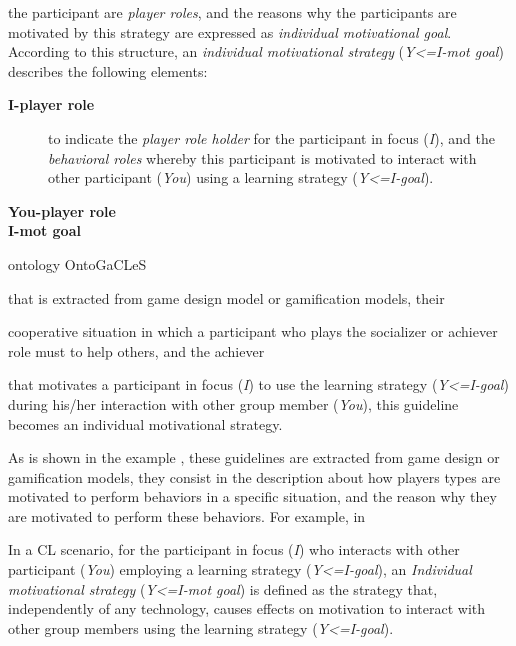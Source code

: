 the participant are \emph{player roles}, and the reasons why the participants are motivated by this strategy are expressed as \emph{individual motivational goal}. According to this structure, an \emph{individual motivational strategy} (\emph{Y<=I-mot goal}) describes the following elements:

\begin{description}
\item[\textbf{I-player role}] 
to indicate the \emph{player role holder} for the participant in focus (\emph{I}), and the \emph{behavioral roles} whereby this participant is motivated to interact with other participant (\emph{You}) using a learning strategy (\emph{Y<=I-goal}).


\item[\textbf{You-player role}]


\item[\textbf{I-mot goal}]

\end{description} 

ontology OntoGaCLeS


 that is extracted from game design model or gamification models, their 



 cooperative situation in which a participant who plays the socializer or achiever role must to help others, and the achiever 





 that motivates a participant in focus (\emph{I}) to use the learning strategy (\emph{Y<=I-goal}) during his/her interaction with other group member (\emph{You}), this guideline becomes an individual motivational strategy.



As is shown in the example , these guidelines are extracted from game design or gamification models, they consist in the description about how players types are motivated to perform behaviors in a specific situation, and the reason why they are motivated to perform these behaviors. For example, in 


In a CL scenario, for the participant in focus (\emph{I}) who interacts with other participant (\emph{You}) employing a learning strategy (\emph{Y<=I-goal}), an \emph{Individual motivational strategy} (\emph{Y<=I-mot goal}) is defined as the strategy that, independently of any technology, causes effects on motivation to interact with other group members using the learning strategy (\emph{Y<=I-goal}).


